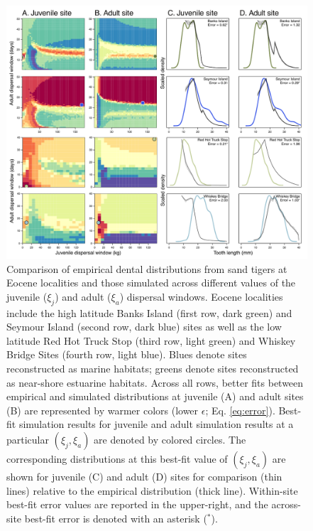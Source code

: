 \documentclass[]{rsos}%
\begin{document}
\begin{figure}
  \centering
  \includegraphics[width=1\linewidth]{fig_empirical_eocene_comp_all2.pdf}
\caption{
Comparison of empirical dental distributions from sand tigers at Eocene localities and those simulated across different values of the juvenile ($\xi_j$) and adult ($\xi_a$) dispersal windows.
Eocene localities include the high latitude Banks Island (first row, dark green) and Seymour Island (second row, dark blue) sites as well as the low latitude Red Hot Truck Stop (third row, light green) and Whiskey Bridge Sites (fourth row, light blue).
Blues denote sites reconstructed as marine habitats; greens denote sites reconstructed as near-shore estuarine habitats.
Across all rows, better fits between empirical and simulated distributions at juvenile (A) and adult sites (B) are represented by warmer colors (lower $\epsilon$; Eq. \ref{eq:error}). 
Best-fit simulation results for juvenile and adult simulation results at a particular $(\xi_j,\xi_a)$ are denoted by colored circles.
The corresponding distributions at this best-fit value of $(\xi_j,\xi_a)$ are shown for juvenile (C) and adult (D) sites for comparison (thin lines) relative to the empirical distribution (thick line). 
Within-site best-fit error values are reported in the upper-right, and the across-site best-fit error is denoted with an asterisk (${}^\ast$).}
\label{fig:comp}
\end{figure}


\clearpage
% 
% 
\end{document}
